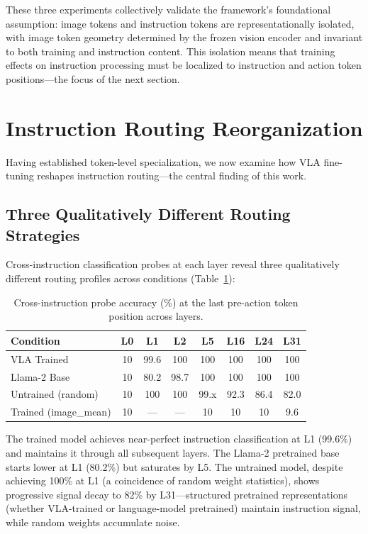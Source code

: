 \documentclass[10pt,letterpaper]{article}
\begin{document}
These three experiments collectively validate the framework's foundational assumption: image tokens and instruction tokens are representationally isolated, with image token geometry determined by the frozen vision encoder and invariant to both training and instruction content. This isolation means that training effects on instruction processing must be localized to instruction and action token positions---the focus of the next section.

\section{Instruction Routing Reorganization}
\label{sec:c2}

Having established token-level specialization, we now examine how VLA fine-tuning reshapes instruction routing---the central finding of this work.

\subsection{Three Qualitatively Different Routing Strategies}

Cross-instruction classification probes at each layer reveal three qualitatively different routing profiles across conditions (Table~\ref{tab:probe_profile}):

\begin{table}[h]
\centering
\caption{Cross-instruction probe accuracy (\%) at the last pre-action token position across layers.}
\label{tab:probe_profile}
\begin{tabular}{lccccccc}
\toprule
Condition & L0 & L1 & L2 & L5 & L16 & L24 & L31 \\
\midrule
VLA Trained & 10 & 99.6 & 100 & 100 & 100 & 100 & 100 \\
Llama-2 Base & 10 & 80.2 & 98.7 & 100 & 100 & 100 & 100 \\
Untrained (random) & 10 & 100 & 100 & 99.x & 92.3 & 86.4 & 82.0 \\
Trained (image\_mean) & 10 & --- & --- & 10 & 10 & 10 & 9.6 \\
\bottomrule
\end{tabular}
\end{table}

The trained model achieves near-perfect instruction classification at L1 (99.6\%) and maintains it through all subsequent layers. The Llama-2 pretrained base starts lower at L1 (80.2\%) but saturates by L5. The untrained model, despite achieving 100\% at L1 (a coincidence of random weight statistics), shows progressive signal decay to 82\% by L31---structured pretrained representations (whether VLA-trained or language-model pretrained) maintain instruction signal, while random weights accumulate noise.
\end{document}
